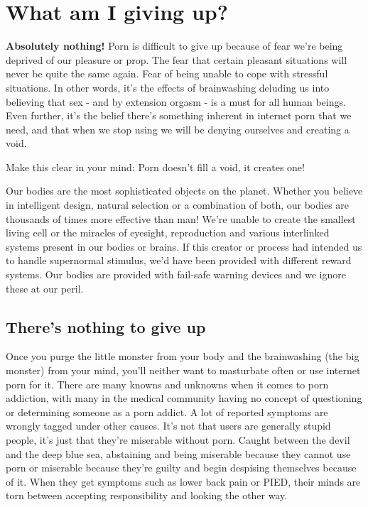 \documentclass[
]{book}
\begin{document}
\hypertarget{what-am-i-giving-up}{%
\chapter{What am I giving up?}\label{what-am-i-giving-up}}

\textbf{Absolutely nothing!} Porn is difficult to give up because of fear we're being deprived of our pleasure or prop. The fear that certain pleasant situations will never be quite the same again. Fear of being unable to cope with stressful situations. In other words, it's the effects of brainwashing deluding us into believing that sex - and by extension orgasm - is a must for all human beings. Even further, it's the belief there's something inherent in internet porn that we need, and that when we stop using we will be denying ourselves and creating a void.

Make this clear in your mind: Porn doesn't fill a void, it creates one!

Our bodies are the most sophisticated objects on the planet. Whether you believe in intelligent design, natural selection or a combination of both, our bodies are thousands of times more effective than man! We're unable to create the smallest living cell or the miracles of eyesight, reproduction and various interlinked systems present in our bodies or brains. If this creator or process had intended us to handle supernormal stimulus, we'd have been provided with different reward systems. Our bodies are provided with fail-safe warning devices and we ignore these at our peril.

\hypertarget{theres-nothing-to-give-up}{%
\section{There's nothing to give up}\label{theres-nothing-to-give-up}}

Once you purge the little monster from your body and the brainwashing (the big monster) from your mind, you'll neither want to masturbate often or use internet porn for it. There are many knowns and unknowns when it comes to porn addiction, with many in the medical community having no concept of questioning or determining someone as a porn addict. A lot of reported symptoms are wrongly tagged under other causes. It's not that users are generally stupid people, it's just that they're miserable without porn. Caught between the devil and the deep blue sea, abstaining and being miserable because they cannot use porn or miserable because they're guilty and begin despising themselves because of it. When they get symptoms such as lower back pain or PIED, their minds are torn between accepting responsibility and looking the other way.
\end{document}
